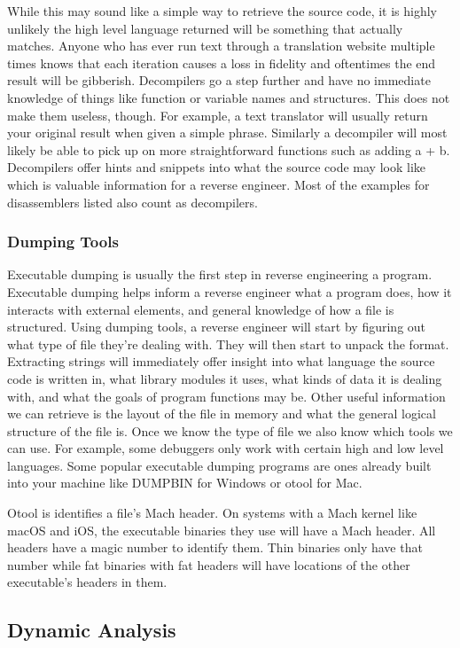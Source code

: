 While this may sound like a simple way to retrieve the source code, it is highly unlikely the high level language returned will be something that actually matches. 
Anyone who has ever run text through a translation website multiple times knows that each iteration causes a loss in fidelity and oftentimes the end result will be gibberish. 
Decompilers go a step further and have no immediate knowledge of things like function or variable names and structures. 
This does not make them useless, though. For example, a text translator will usually return your original result when given a simple phrase. 
Similarly a decompiler will most likely be able to pick up on more straightforward functions such as adding a + b. 
Decompilers offer hints and snippets into what the source code may look like which is valuable information for a reverse engineer. 
Most of the examples for disassemblers listed also count as decompilers.

\subsubsection{Dumping Tools}
Executable dumping is usually the first step in reverse engineering a program. 
Executable dumping helps inform a reverse engineer what a program does, how it interacts with external elements, and general knowledge of how a file is structured. 
Using dumping tools, a reverse engineer will start by figuring out what type of file they’re dealing with. 
They will then start to unpack the format. 
Extracting strings will immediately offer insight into what language the source code is written in, what library modules it uses, what kinds of data it is dealing with, and what the goals of program functions may be. 
Other useful information we can retrieve is the layout of the file in memory and what the general logical structure of the file is. Once we know the type of file we also know which tools we can use. 
For example, some debuggers only work with certain high and low level languages. 
Some popular executable dumping programs are ones already built into your machine like DUMPBIN for Windows or otool for Mac. 

Otool is identifies a file's Mach header. 
On systems with a Mach kernel like macOS and iOS, the executable binaries they use will have a Mach header. 
All headers have a magic number to identify them. Thin binaries only have that number while fat binaries with fat headers will have locations of the other executable's headers in them.

\subsection{Dynamic Analysis}

